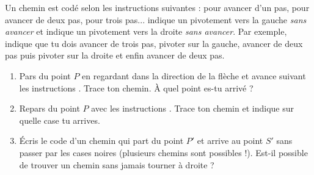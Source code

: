 \documentclass[class=report,crop=false, 12pt]{standalone}
\begin{document}
\begin{activite}
Un chemin est codé selon les instructions suivantes :  pour avancer d’un pas,  pour avancer de deux pas,  pour trois pas...  indique un pivotement vers la gauche \emph{sans avancer} et  indique un pivotement vers la droite \emph{sans avancer}. Par exemple,  indique que tu dois avancer de trois pas, pivoter sur la gauche, avancer de deux pas puis pivoter sur la droite et enfin avancer de deux pas.
\begin{enumerate}
  \item Pars du point $P$ en regardant dans la direction de la flèche et avance suivant les instructions . Trace ton chemin. À quel point es-tu arrivé ?
  
  
  \item Repars du point $P$ avec les instructions . Trace ton chemin et indique sur quelle case tu arrives.

  \item Écris le code d'un chemin qui part du point $P'$ et arrive au point $S'$ sans passer par les cases noires (plusieurs chemins sont possibles !). Est-il possible de trouver un chemin sans jamais tourner à droite ?

  
\end{enumerate}
\end{activite}
\end{document}
